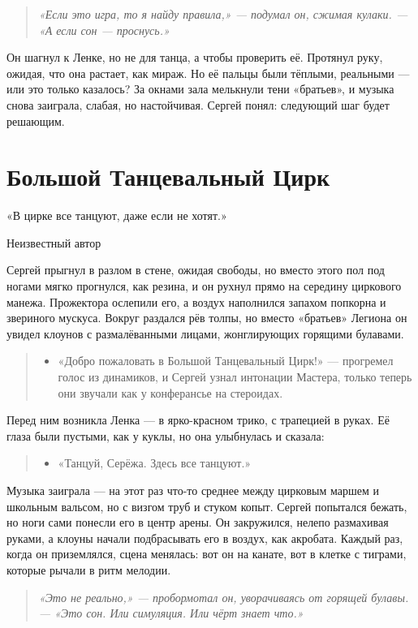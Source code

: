 \documentclass[12pt,a4paper]{book}
\newenvironment{dialogue}{\begin{quote}\itshape\begin{itemize}\item[]}{\end{itemize}\end{quote}}
\newenvironment{innerthought}{\begin{quote}\small\itshape}{\end{quote}}
\begin{document}
\begin{innerthought}
«Если это игра, то я найду правила,» --- подумал он, сжимая кулаки. --- «А если сон — проснусь.»
\end{innerthought}

Он шагнул к Ленке, но не для танца, а чтобы проверить её. Протянул руку, ожидая, что она растает, как мираж. Но её пальцы были тёплыми, реальными --- или это только казалось? За окнами зала мелькнули тени «братьев», и музыка снова заиграла, слабая, но настойчивая. Сергей понял: следующий шаг будет решающим.

\chapter{Большой Танцевальный Цирк}
\epigraph{«В цирке все танцуют, даже если не хотят.»}{Неизвестный автор}

Сергей прыгнул в разлом в стене, ожидая свободы, но вместо этого пол под ногами мягко прогнулся, как резина, и он рухнул прямо на середину циркового манежа. Прожектора ослепили его, а воздух наполнился запахом попкорна и звериного мускуса. Вокруг раздался рёв толпы, но вместо «братьев» Легиона он увидел клоунов с размалёванными лицами, жонглирующих горящими булавами.

\begin{dialogue}
«Добро пожаловать в Большой Танцевальный Цирк!» --- прогремел голос из динамиков, и Сергей узнал интонации Мастера, только теперь они звучали как у конферансье на стероидах.
\end{dialogue}

Перед ним возникла Ленка --- в ярко-красном трико, с трапецией в руках. Её глаза были пустыми, как у куклы, но она улыбнулась и сказала:

\begin{dialogue}
«Танцуй, Серёжа. Здесь все танцуют.»
\end{dialogue}

Музыка заиграла --- на этот раз что-то среднее между цирковым маршем и школьным вальсом, но с визгом труб и стуком копыт. Сергей попытался бежать, но ноги сами понесли его в центр арены. Он закружился, нелепо размахивая руками, а клоуны начали подбрасывать его в воздух, как акробата. Каждый раз, когда он приземлялся, сцена менялась: вот он на канате, вот в клетке с тиграми, которые рычали в ритм мелодии.

\begin{innerthought}
«Это не реально,» --- пробормотал он, уворачиваясь от горящей булавы. --- «Это сон. Или симуляция. Или чёрт знает что.»
\end{innerthought}
\end{document}
